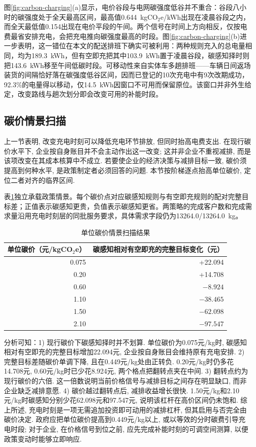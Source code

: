 \documentclass{setp-new}
\begin{document}
图\ref{fig:carbon-charging}(a)显示，电价谷段与电网碳强度低谷并不重合：谷段八小时的碳强度处于全天最高区间，最高值0.644~kgCO$_2$e/kWh出现在凌晨谷段之内，而全天最低值0.154出现在电价平段的午间。两个信号在时间上方向相反，仅按电费最省安排充电，会把充电推向碳强度最高的时段。图\ref{fig:carbon-charging}(b)进一步表明，这一错位在本文的配送排班下确实可被利用：两种规则充入的总电量相同，均为189.3~kWh，但有空即充把其中103.9~kWh置于凌晨谷段，碳感知择时则把143.6~kWh移至午间低碳时段。可移动性来自实体车多趟排班——车辆日间返场装货的间隔恰好落在碳强度低谷区间，因而已登记的10次充电中有9次改期成功，92.3\%的电量得以移动，仅14.5~kWh因窗口不可用而保留原位。该窗口并非外生给定，改变路线与趟次划分即会改变可用的补能时段。

\subsection{碳价情景扫描}

上一节表明, 改变充电时刻可以降低充电环节排放, 但同时抬高电费支出.
在现行碳价水平下, 企业按自身账目并不会主动作出这一改变;
这并非企业不重视减排, 而是该项改变在其成本核算中不成立.
若要使企业的经济决策与减排目标一致, 碳价须提高到何种水平, 是政策制定者必须回答的问题.
本节按阶梯逐点抬高单位碳价, 定位二者对齐的临界区间.

表\ref{tab:carbon-price}独立承载政策情景。每个碳价点对应碳感知规则与有空即充规则的配对完整目标差；正值表示碳感知更贵，负值表示碳感知更省。两策略的完成客户数和完成需求量沿用充电时刻层的同批服务要求，具体需求字段仍为13264.0/13264.0~kg。

\begin{table}[htbp]
  \centering
  \caption{单位碳价情景扫描结果}
  \label{tab:carbon-price}
  \small
  \begin{tabular}{rr}
    \toprule
    单位碳价（元/kgCO$_2$e） & 碳感知相对有空即充的完整目标变化（元）\\
    \midrule
    0.075 & +22.094\\
    0.20 & +14.708\\
    0.60 & $-8.924$\\
    1.10 & $-38.465$\\
    1.50 & $-62.098$\\
    2.10 & $-97.547$\\
    \bottomrule
  \end{tabular}
\end{table}

分析可知：1) 现行碳价下碳感知择时并不划算. 单位碳价为0.075元/kg时, 碳感知相对有空即充的完整目标增加22.094元, 企业按自身账目会维持原有充电安排.
2) 完整目标差随碳价单调下降, 且在0.449元/kg处由正转负. 0.20元/kg时仍多花14.708元, 0.60元/kg时已少花8.924元, 两个格点把翻转点夹在中间.
3) 翻转点约为现行碳价的六倍. 这一倍数说明当前价格信号与减排目标之间存在明显缺口, 而非企业缺乏减排意愿.
4) 碳价越过翻转点后, 减排收益增长很快. 1.50元/kg和2.10元/kg时碳感知分别少花62.098元和97.547元, 说明该杠杆在高价区间仍未饱和.
综上所述, 充电时刻是一项无需追加投资即可动用的减排杠杆, 但其启用与否完全由碳价决定. 政府应把单位碳价提高到0.449元/kg以上, 或以等效的分时碳费引导充电时段; 对于企业, 在价格信号到位之前, 应先完成补能时刻的可调空间测算, 以便政策变动时能够立即响应.
\end{document}
